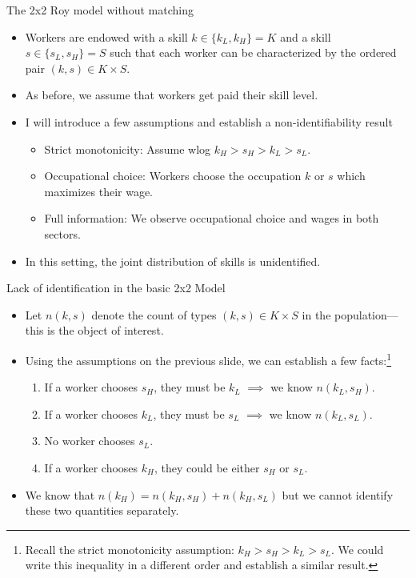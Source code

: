 \documentclass[aspectratio=169]{beamer}
\begin{document}
\begin{frame}{The 2x2 Roy model without matching}
	\begin{itemize}
		\item Workers are endowed with a skill $k\in\{k_L,k_H\}=K$ and a skill $s\in\{s_L,s_H\}=S$ such that each worker can be characterized by the ordered pair $(k,s)\in K\times S$.
		\bigskip
		\item As before, we assume that workers get paid their skill level.
		\bigskip
		\item I will introduce a few assumptions and establish a non-identifiability result
		\begin{itemize}
			\item Strict monotonicity: Assume wlog $k_H > s_H > k_L > s_L$.
			\smallskip
			\item Occupational choice: Workers choose the occupation $k$ or $s$ which maximizes their wage.
			\smallskip
			\item Full information: We observe occupational choice and wages in both sectors.
		\end{itemize}
		\bigskip
		\item In this setting, the joint distribution of skills is unidentified.
	\end{itemize}
\end{frame}

\begin{frame}{Lack of identification in the basic 2x2 Model}
	\begin{itemize}
		\item Let $n(k,s)$ denote the count of types $(k,s)\in K\times S$ in the population---this is the object of interest.
		\smallskip
		\item Using the assumptions on the previous slide, we can establish a few facts:\footnote{Recall the strict monotonicity assumption: $k_H > s_H > k_L > s_L$. We could write this inequality in a different order and establish a similar result.}
		\begin{enumerate}
			\item If a worker chooses $s_H$, they must be $k_L$ $\implies$ we know $n(k_L,s_H)$.
			\item If a worker chooses $k_L$, they must be $s_L$ $\implies$ we know $n(k_L,s_L)$.
			\item No worker chooses $s_L$.
			\item If a worker chooses $k_H$, they could be either $s_H$ or $s_L$.
		\end{enumerate}
		\smallskip
		\item We know that $n(k_H) = n(k_H,s_H) + n(k_H,s_L)$ but we cannot identify these two quantities separately.
	\end{itemize}
\end{frame}
\end{document}
